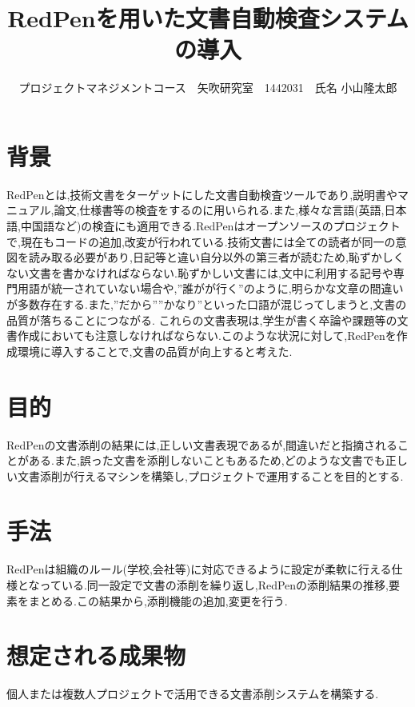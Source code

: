 \documentclass[uplatex,twocolumn,dvipdfmx]{jsarticle}
\title{\vspace{-5mm}\fontsize{14pt}{0pt}\selectfont RedPenを用いた文書自動検査システムの導入}
\author{\normalsize プロジェクトマネジメントコース　矢吹研究室　1442031　氏名 小山隆太郎}
\date{}
\begin{document}
\fontsize{10.5pt}{\baselineskip}\selectfont
\maketitle





\section{背景}
RedPen\cite{a}とは,技術文書をターゲットにした文書自動検査ツールであり,説明書やマニュアル,論文,仕様書等の検査をするのに用いられる.また,様々な言語(英語,日本語,中国語など)の検査にも適用できる.RedPenはオープンソースのプロジェクトで,現在もコードの追加,改変が行われている\cite{b}.技術文書には全ての読者が同一の意図を読み取る必要があり,日記等と違い自分以外の第三者が読むため,恥ずかしくない文書を書かなければならない.恥ずかしい文書には,文中に利用する記号や専門用語が統一されていない場合や,”誰がが行く”のように,明らかな文章の間違いが多数存在する.また,”だから””かなり”といった口語が混じってしまうと,文書の品質が落ちることにつながる.
これらの文書表現は,学生が書く卒論や課題等の文書作成においても注意しなければならない.このような状況に対して,RedPenを作成環境に導入することで,文書の品質が向上すると考えた.

\section{目的}
RedPenの文書添削の結果には,正しい文書表現であるが,間違いだと指摘されることがある.また,誤った文書を添削しないこともあるため,どのような文書でも正しい文書添削が行えるマシンを構築し,プロジェクトで運用することを目的とする.

\section{手法}
RedPenは組織のルール(学校,会社等)に対応できるように設定が柔軟に行える仕様となっている\cite{c}.同一設定で文書の添削を繰り返し,RedPenの添削結果の推移,要素をまとめる.この結果から,添削機能の追加,変更を行う.

\section{想定される成果物}
個人または複数人プロジェクトで活用できる文書添削システムを構築する.
\end{document}
